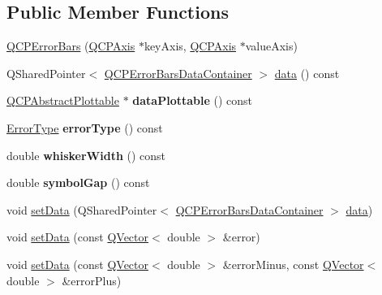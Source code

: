 \subsection*{Public Member Functions}
\begin{DoxyCompactItemize}
\item 
\hyperlink{class_q_c_p_error_bars_a5cdcc33e5f173780c3d657e96216e5c1}{Q\+C\+P\+Error\+Bars} (\hyperlink{class_q_c_p_axis}{Q\+C\+P\+Axis} $\ast$key\+Axis, \hyperlink{class_q_c_p_axis}{Q\+C\+P\+Axis} $\ast$value\+Axis)
\item 
Q\+Shared\+Pointer$<$ \hyperlink{class_q_vector}{Q\+C\+P\+Error\+Bars\+Data\+Container} $>$ \hyperlink{class_q_c_p_error_bars_aeebd1b14f4c3573565efafd514988813}{data} () const
\item 
\mbox{\label{class_q_c_p_error_bars_ad7e5f1229db58d05bb3d8305d2504af8}} 
\hyperlink{class_q_c_p_abstract_plottable}{Q\+C\+P\+Abstract\+Plottable} $\ast$ {\bfseries data\+Plottable} () const
\item 
\mbox{\label{class_q_c_p_error_bars_a527e7df83c98709cef22a8447fee4f13}} 
\hyperlink{class_q_c_p_error_bars_a95f0220f11a72648b96480a85ce26474}{Error\+Type} {\bfseries error\+Type} () const
\item 
\mbox{\label{class_q_c_p_error_bars_ae5a292470366ec92b248753f83b8646e}} 
double {\bfseries whisker\+Width} () const
\item 
\mbox{\label{class_q_c_p_error_bars_a2c969749fa0db565a42b80db9da5f388}} 
double {\bfseries symbol\+Gap} () const
\item 
void \hyperlink{class_q_c_p_error_bars_a92b1980003255f5f7c05407a4d92aabc}{set\+Data} (Q\+Shared\+Pointer$<$ \hyperlink{class_q_vector}{Q\+C\+P\+Error\+Bars\+Data\+Container} $>$ \hyperlink{class_q_c_p_error_bars_aeebd1b14f4c3573565efafd514988813}{data})
\item 
void \hyperlink{class_q_c_p_error_bars_a2f33d68a7ec163b09017dce3d9d3abcc}{set\+Data} (const \hyperlink{class_q_vector}{Q\+Vector}$<$ double $>$ \&error)
\item 
void \hyperlink{class_q_c_p_error_bars_aac0cf070b957c11177e91b02bcb433c8}{set\+Data} (const \hyperlink{class_q_vector}{Q\+Vector}$<$ double $>$ \&error\+Minus, const \hyperlink{class_q_vector}{Q\+Vector}$<$ double $>$ \&error\+Plus)

\end{DoxyCompactItemize}

